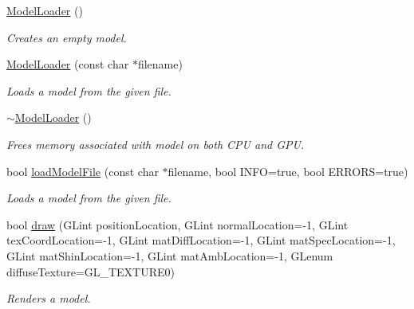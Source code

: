 \begin{DoxyCompactItemize}
\item 
\mbox{\label{class_c_s_c_i441_1_1_model_loader_afd8c5602678127d25348714be53342a5}} 
\hyperlink{class_c_s_c_i441_1_1_model_loader_afd8c5602678127d25348714be53342a5}{Model\+Loader} ()
\begin{DoxyCompactList}\small\item\em Creates an empty model. \end{DoxyCompactList}\item 
\hyperlink{class_c_s_c_i441_1_1_model_loader_a1223befa1c79f54b33a48a13efd8f639}{Model\+Loader} (const char $\ast$filename)
\begin{DoxyCompactList}\small\item\em Loads a model from the given file. \end{DoxyCompactList}\item 
\mbox{\label{class_c_s_c_i441_1_1_model_loader_ab30fbbe152e05c88300f98fa33998102}} 
\hyperlink{class_c_s_c_i441_1_1_model_loader_ab30fbbe152e05c88300f98fa33998102}{$\sim$\+Model\+Loader} ()
\begin{DoxyCompactList}\small\item\em Frees memory associated with model on both C\+PU and G\+PU. \end{DoxyCompactList}\item 
bool \hyperlink{class_c_s_c_i441_1_1_model_loader_a2ee2d1efb2279540d9d89885ed173ac0}{load\+Model\+File} (const char $\ast$filename, bool I\+N\+FO=true, bool E\+R\+R\+O\+RS=true)
\begin{DoxyCompactList}\small\item\em Loads a model from the given file. \end{DoxyCompactList}\item 
bool \hyperlink{class_c_s_c_i441_1_1_model_loader_a46734dcf7845e240a1ca9a31d6e5a468}{draw} (G\+Lint position\+Location, G\+Lint normal\+Location=-\/1, G\+Lint tex\+Coord\+Location=-\/1, G\+Lint mat\+Diff\+Location=-\/1, G\+Lint mat\+Spec\+Location=-\/1, G\+Lint mat\+Shin\+Location=-\/1, G\+Lint mat\+Amb\+Location=-\/1, G\+Lenum diffuse\+Texture=G\+L\+\_\+\+T\+E\+X\+T\+U\+R\+E0)
\begin{DoxyCompactList}\small\item\em Renders a model. \end{DoxyCompactList}\end{DoxyCompactItemize}
